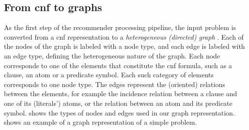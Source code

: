 \begin{figure}[h]

\fi

\end{figure}

\subsection{From \gls{cnf} to graphs}
\label{sec:graphifier}

As the first step of the recommender processing pipeline,
the input problem is converted from a \gls{cnf} representation
to a \emph{heterogeneous (directed) graph} \cite{Zhou2018}.
Each of the nodes of the graph is labeled with a node type,
and each edge is labeled with an edge type,
defining the heterogeneous nature of the graph.
Each node corresponds to one of the elements that constitute the \gls{cnf} formula,
such as a clause, an atom or a predicate symbol.
Each such category of elements corresponds to one node type.
The edges represent the (oriented) relations between the elements,
for example the incidence relation between a clause and one of its (literals') atoms,
or the relation between an atom and its predicate symbol.
 shows the types of nodes and edges used in our graph representation.
 shows an example of a graph representation of a simple problem.

